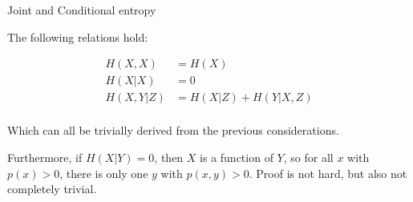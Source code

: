 
\begin{vbframe} {Joint and Conditional entropy}

The following relations hold:

\begin{equation*}
\begin{aligned}
H(X, X)       &= H(X)  \\
H(X | X)      &= 0  \\
H(X, Y | Z)   &=H(X | Z)+H(Y | X, Z)\\
\end{aligned}
\end{equation*}

Which can all be trivially derived from the previous considerations.

\lz

Furthermore, if $H(X|Y) = 0$, then $X$ is a function of $Y$, so for all $x$ with $p(x)>0$, there is only one $y$ with $p(x,y)>0$. 
Proof is not hard, but also not completely trivial.
\end{vbframe}

